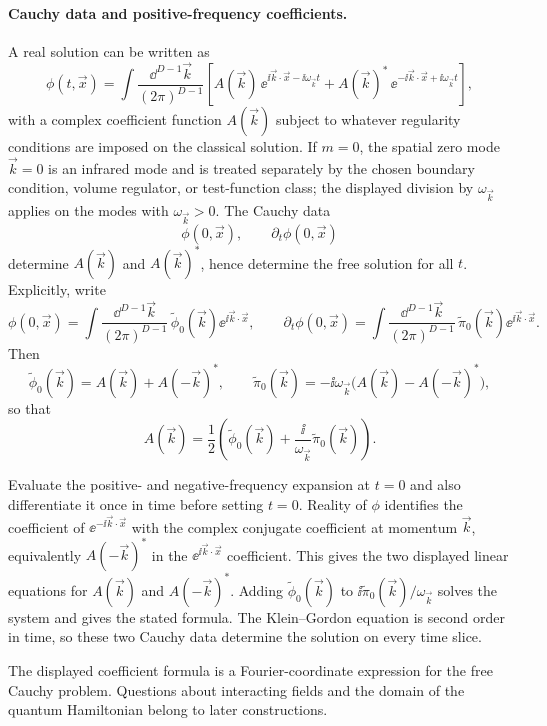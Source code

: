 \paragraph{Cauchy data and positive-frequency coefficients.}
A real solution can be written as
\[
  \phi(t,\vec x)
  =
  \int\frac{\dd^{D-1}\vec k}{(2\pi)^{D-1}}
  \left[
    A(\vec k)\,\ee^{\ii\vec k\cdot\vec x-\ii\omega_{\vec k}t}
    +
    A(\vec k)^*\,\ee^{-\ii\vec k\cdot\vec x+\ii\omega_{\vec k}t}
  \right],
\]
with a complex coefficient function \(A(\vec k)\) subject to whatever
regularity conditions are imposed on the classical solution. If \(m=0\), the
spatial zero mode \(\vec k=0\) is an infrared mode and is treated separately
by the chosen boundary condition, volume regulator, or test-function class;
the displayed division by \(\omega_{\vec k}\) applies on the modes with
\(\omega_{\vec k}>0\).  The Cauchy data
\[
  \phi(0,\vec x),\qquad \partial_t\phi(0,\vec x)
\]
determine \(A(\vec k)\) and \(A(\vec k)^*\), hence determine the free
solution for all \(t\). Explicitly, write
\[
  \phi(0,\vec x)
  =
  \int\frac{\dd^{D-1}\vec k}{(2\pi)^{D-1}}\,
  \widetilde\phi_0(\vec k)\ee^{\ii\vec k\cdot\vec x},
  \qquad
  \partial_t\phi(0,\vec x)
  =
  \int\frac{\dd^{D-1}\vec k}{(2\pi)^{D-1}}\,
  \widetilde\pi_0(\vec k)\ee^{\ii\vec k\cdot\vec x}.
\]
Then
\[
  \widetilde\phi_0(\vec k)
  =
  A(\vec k)+A(-\vec k)^*,
  \qquad
  \widetilde\pi_0(\vec k)
  =
  -\ii\omega_{\vec k}\bigl(A(\vec k)-A(-\vec k)^*\bigr),
\]
so that
\[
  A(\vec k)
  =
  \frac12\left(
    \widetilde\phi_0(\vec k)
    +
    \frac{\ii}{\omega_{\vec k}}\widetilde\pi_0(\vec k)
  \right).
\]

Evaluate the positive- and negative-frequency expansion at \(t=0\) and also
differentiate it once in time before setting \(t=0\).  Reality of \(\phi\)
identifies the coefficient of \(\ee^{-\ii\vec k\cdot\vec x}\) with the
complex conjugate coefficient at momentum \(\vec k\), equivalently
\(A(-\vec k)^*\) in the \(\ee^{\ii\vec k\cdot\vec x}\) coefficient.  This
gives the two displayed linear equations for
\(A(\vec k)\) and \(A(-\vec k)^*\).  Adding
\(\widetilde\phi_0(\vec k)\) to \(\ii\widetilde\pi_0(\vec k)/\omega_{\vec k}\)
solves the system and gives the stated formula.  The Klein--Gordon equation is
second order in time, so these two Cauchy data determine the solution on every
time slice.

The displayed coefficient formula is a Fourier-coordinate expression for the
free Cauchy problem.  Questions about interacting fields and the domain of the
quantum Hamiltonian belong to later constructions.

